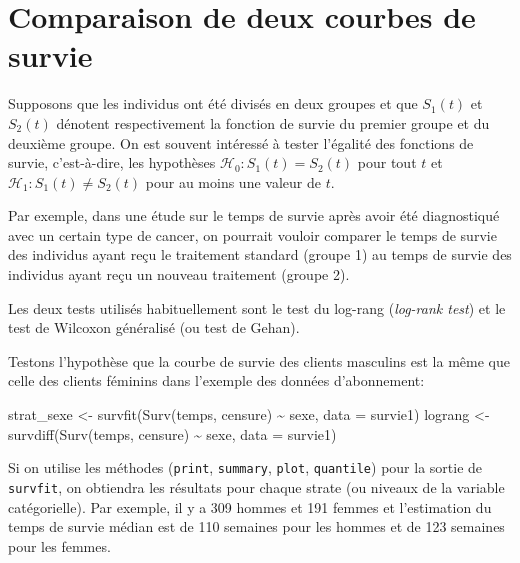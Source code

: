 \documentclass[
  11pt,
  letterpaper,
]{scrbook}
\newenvironment{Shaded}{\begin{snugshade}}{\end{snugshade}}
\newcommand{\AttributeTok}[1]{\textcolor[rgb]{0.40,0.45,0.13}{#1}}
\newcommand{\FunctionTok}[1]{\textcolor[rgb]{0.28,0.35,0.67}{#1}}
\newcommand{\NormalTok}[1]{\textcolor[rgb]{0.00,0.23,0.31}{#1}}
\newcommand{\OtherTok}[1]{\textcolor[rgb]{0.00,0.23,0.31}{#1}}
\newcommand{\SpecialCharTok}[1]{\textcolor[rgb]{0.37,0.37,0.37}{#1}}
\theoremstyle{definition}
\theoremstyle{remark}
\begin{document}
\hypertarget{comparaison-de-deux-courbes-de-survie}{%
\section{Comparaison de deux courbes de
survie}\label{comparaison-de-deux-courbes-de-survie}}

Supposons que les individus ont été divisés en deux groupes et que
\(S_1(t)\) et \(S_2(t)\) dénotent respectivement la fonction de survie
du premier groupe et du deuxième groupe. On est souvent intéressé à
tester l'égalité des fonctions de survie, c'est-à-dire, les hypothèses
\(\mathscr{H}_0: S_1(t) = S_2(t)\) pour tout \(t\) et
\(\mathscr{H}_1: S_1(t) \neq S_2(t)\) pour au moins une valeur de \(t\).

Par exemple, dans une étude sur le temps de survie après avoir été
diagnostiqué avec un certain type de cancer, on pourrait vouloir
comparer le temps de survie des individus ayant reçu le traitement
standard (groupe 1) au temps de survie des individus ayant reçu un
nouveau traitement (groupe 2).

Les deux tests utilisés habituellement sont le test du log-rang
(\emph{log-rank test}) et le test de Wilcoxon généralisé (ou test de
Gehan).

Testons l'hypothèse que la courbe de survie des clients masculins est la
même que celle des clients féminins dans l'exemple des données
d'abonnement:

\begin{Shaded}
\begin{Highlighting}[]
\NormalTok{strat\_sexe }\OtherTok{\textless{}{-}} \FunctionTok{survfit}\NormalTok{(}\FunctionTok{Surv}\NormalTok{(temps, censure) }\SpecialCharTok{\textasciitilde{}}\NormalTok{ sexe, }\AttributeTok{data =}\NormalTok{ survie1)}
\NormalTok{lograng }\OtherTok{\textless{}{-}} \FunctionTok{survdiff}\NormalTok{(}\FunctionTok{Surv}\NormalTok{(temps, censure) }\SpecialCharTok{\textasciitilde{}}\NormalTok{ sexe, }\AttributeTok{data =}\NormalTok{ survie1)}
\end{Highlighting}
\end{Shaded}

Si on utilise les méthodes (\texttt{print}, \texttt{summary},
\texttt{plot}, \texttt{quantile}) pour la sortie de \texttt{survfit}, on
obtiendra les résultats pour chaque strate (ou niveaux de la variable
catégorielle). Par exemple, il y a 309 hommes et 191 femmes et
l'estimation du temps de survie médian est de 110 semaines pour les
hommes et de 123 semaines pour les femmes.
\end{document}
